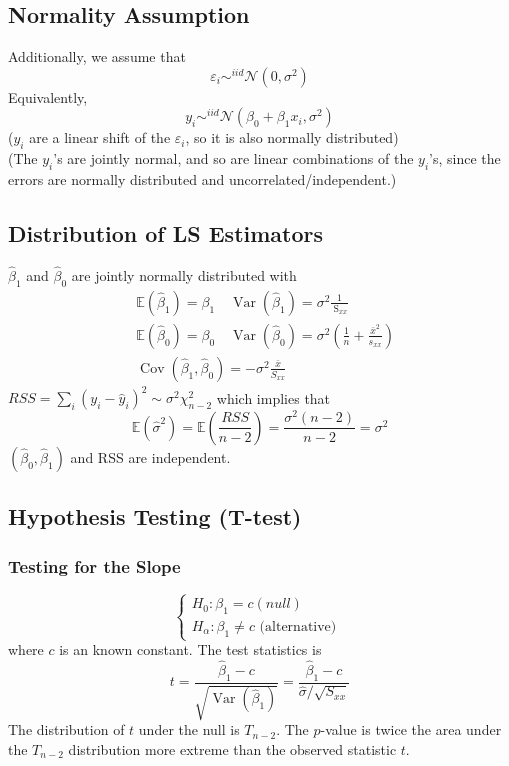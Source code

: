 \documentclass[11pt,a4paper]{article}
\begin{document}
\subsection{Normality Assumption}
Additionally, we assume that$$\varepsilon_i\sim^{iid}\mathcal{N}(0,\sigma^2)$$
Equivalently,$$y_i\sim^{iid}\mathcal{N}(\beta_0+\beta_1x_i,\sigma^2)$$
($y_i$ are a linear shift of the $\varepsilon_i$, so it is also normally distributed)\\
(The $y_i$’s are jointly normal, and so are linear combinations of the $y_i$’s, since the errors are normally distributed and uncorrelated/independent.)

\subsection{Distribution of LS Estimators}
$\hat{\beta}_{1}$ and $\hat{\beta}_{0}$ are jointly normally distributed with
$$
\begin{aligned}
&\mathbb{E}\left(\hat{\beta}_{1}\right)=\beta_{1} \quad \operatorname{Var}\left(\hat{\beta}_{1}\right)=\sigma^{2} \frac{1}{\mathrm{~S}_{x x}} \\
&\mathbb{E}\left(\hat{\beta}_{0}\right)=\beta_{0} \quad \operatorname{Var}\left(\hat{\beta}_{0}\right)=\sigma^{2}\left(\frac{1}{n}+\frac{\bar{x}^{2}}{s_{x x}}\right) \\
&\operatorname{Cov}\left(\hat{\beta}_{1}, \hat{\beta}_{0}\right)=-\sigma^{2} \frac{\bar{x}}{S_{x x}}
\end{aligned}
$$
$R S S=\sum_{i}\left(y_{i}-\hat{y}_{i}\right)^{2} \sim \sigma^{2} \chi_{n-2}^{2}$ which implies that
$$
\mathbb{E}\left(\hat{\sigma}^{2}\right)=\mathbb{E}\left(\frac{R S S}{n-2}\right)=\frac{\sigma^{2}(n-2)}{n-2}=\sigma^{2}
$$
$\left(\hat{\beta}_{0}, \hat{\beta}_{1}\right)$ and RSS are independent.

\subsection{Hypothesis Testing (T-test)}
\subsubsection{Testing for the Slope}
$$
\left\{\begin{array}{l}
H_{0}: \beta_{1}=c(n u l l) \\
H_{\alpha}: \beta_{1} \neq c \text { (alternative) }
\end{array}\right.
$$
where $c$ is an known constant.
The test statistics is
$$
t=\frac{\hat{\beta}_{1}-c}{\sqrt{\operatorname{Var}\left(\hat{\beta}_{1}\right)}}=\frac{\hat{\beta}_{1}-c}{\hat{\sigma} / \sqrt{S_{x x}}}
$$
The distribution of $t$ under the null is $T_{n-2}$.
The $p$-value is twice the area under the $T_{n-2}$ distribution more extreme than the observed statistic $t$.
\end{document}

